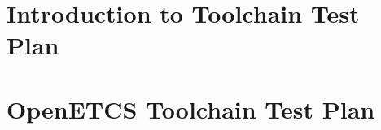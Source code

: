 \documentclass{template/openetcs_report}
\begin{document}
\mainmatter







\chapter{Introduction to Toolchain Test Plan}
\label{chap:Test Plan introduction}




\chapter{OpenETCS Toolchain Test Plan}
\label{chap:test-plan}





\end{document}
